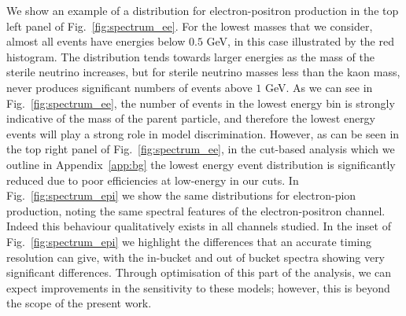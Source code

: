 \documentclass[11pt, a4paper]{article}
\newcommand{\reffig}[1]{Fig.~\ref{#1}}
\newcommand{\refapp}[1]{Appendix~\ref{#1}}
\def\muboone{MicroBooNE}
\def\ster{\ensuremath N}
\begin{document}
We show an example of a distribution for electron-positron production in the
top left panel of \reffig{fig:spectrum_ee}. For the lowest masses that we consider, almost all events have
energies below $0.5$ GeV, in this case illustrated by the red histogram. The
distribution tends towards larger energies as the mass of the sterile neutrino
increases, but for sterile neutrino masses less than the kaon mass, never produces
significant numbers of events above $1$ GeV. As we can see in
\reffig{fig:spectrum_ee}, the number of events in the lowest energy bin is
strongly indicative of the mass of the parent particle, and therefore the
lowest energy events will play a strong role in model discrimination. However,
as can be seen in the top right panel of \reffig{fig:spectrum_ee}, in the
cut-based analysis which we outline in \refapp{app:bg} the lowest energy event
distribution is significantly reduced due to poor efficiencies at low-energy in
our cuts. In \reffig{fig:spectrum_epi} we show the same
distributions for electron-pion production, noting the same spectral features
of the electron-positron channel. Indeed this behaviour qualitatively exists in all channels studied. In the inset of \reffig{fig:spectrum_epi} we highlight the differences
that an accurate timing resolution can give, with the in-bucket and out of bucket
spectra showing very significant differences.  Through optimisation of this part of
the analysis, we can expect improvements in the sensitivity to these models;
however, this is beyond the scope of the present work.  



%
\end{document}
